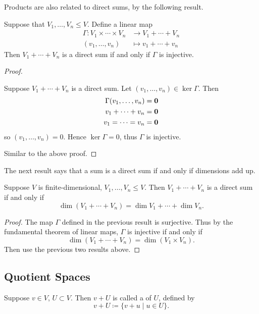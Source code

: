 Products are also related to direct sums, by the following result.

\begin{proposition}
Suppose that $V_1,\dots,V_n\le V$. Define a linear map 
\begin{align*}
\Gamma:V_1\times\cdots\times V_n&\to V_1+\cdots+V_n\\
(v_1,\dots,v_n)&\mapsto v_1+\cdots+v_n
\end{align*}
Then $V_1+\cdots+V_n$ is a direct sum if and only if $\Gamma$ is injective.
\end{proposition}

\begin{proof} \

 Suppose $V_1+\cdots+V_n$ is a direct sum. Let $(v_1,\dots,v_n)\in\ker\Gamma$. Then
\begin{align*}
\Gamma(v_1,\dots,v_n)&=\vb{0}\\
v_1+\cdots+v_n&=\vb{0}\\
v_1=\cdots=v_n&=\vb{0}
\end{align*}
so $(v_1,\dots,v_n)=0$. Hence $\ker\Gamma=0$, thus $\Gamma$ is injective.

 Similar to the above proof.
\end{proof}

The next result says that a sum is a direct sum if and only if dimensions add up.

\begin{proposition}
Suppose $V$ is finite-dimensional, $V_1,\dots,V_n\le V$. Then $V_1+\cdots+V_n$ is a direct sum if and only if
\[\dim(V_1+\cdots+V_n)=\dim V_1+\cdots+\dim V_n.\]
\end{proposition}

\begin{proof}
The map $\Gamma$ defined in the previous result is surjective. Thus by the fundamental theorem of linear maps, $\Gamma$ is injective if and only if
\[\dim(V_1+\cdots+V_n)=\dim(V_1\times V_n).\]
Then use the previous two results above.
\end{proof}

\subsection{Quotient Spaces}
\begin{definition}[Coset]
Suppose $v\in V$, $U\subset V$. Then $v+U$ is called a  of $U$, defined by
\[v+U\coloneqq\{v+u\mid u\in U\}.\]
\end{definition}

